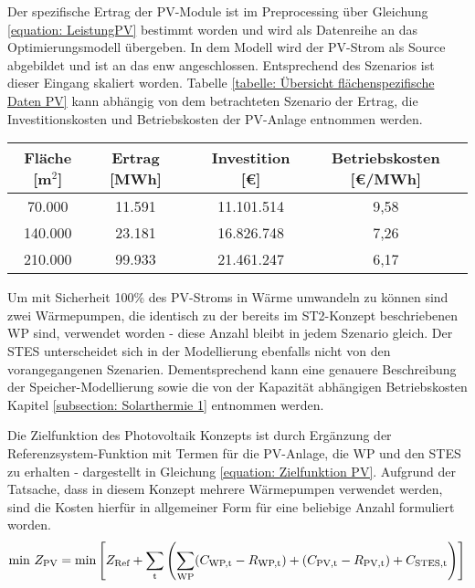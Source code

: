 Der spezifische Ertrag der \ac{PV}-Module ist im Preprocessing über Gleichung \ref{equation: LeistungPV} bestimmt worden und wird als Datenreihe an das Optimierungsmodell übergeben. In dem Modell wird der \ac{PV}-Strom als Source abgebildet und ist an das enw angeschlossen. Entsprechend des Szenarios ist dieser Eingang skaliert worden. Tabelle \ref{tabelle: Übersicht flächenspezifische Daten PV} kann abhängig von dem betrachteten Szenario der Ertrag, die Investitionskosten und Betriebskosten der \ac{PV}-Anlage entnommen werden. 
	\begin{center}
		\label{tabelle: Übersicht flächenspezifische Daten PV}
		\begin{tabular}{ccccc}
			\hline 
			Fläche [m$^2$] & Ertrag [MWh] & & Investition [\euro]  & Betriebskosten [\euro/MWh] \tabularnewline
			\hline 
			70.000 & 11.591 & & 11.101.514 & 9,58 \tabularnewline
			140.000 & 23.181 & & 16.826.748 & 7,26 \tabularnewline
			210.000 & 99.933 & & 21.461.247 & 6,17 \tabularnewline		
			\hline
		\end{tabular}
	\end{center} 

Um mit Sicherheit 100\% des \ac{PV}-Stroms in Wärme umwandeln zu können sind zwei Wärmepumpen, die identisch zu der bereits im ST2-Konzept beschriebenen \ac{WP} sind, verwendet worden - diese Anzahl bleibt in jedem Szenario gleich. 
Der \ac{STES} unterscheidet sich in der Modellierung ebenfalls nicht von den vorangegangenen Szenarien. Dementsprechend kann eine genauere Beschreibung der Speicher-Modellierung sowie die von der Kapazität abhängigen Betriebskosten Kapitel \ref{subsection: Solarthermie 1} entnommen werden. 

Die Zielfunktion des Photovoltaik Konzepts ist durch Ergänzung der Referenzsystem-Funktion mit Termen für die \ac{PV}-Anlage, die \ac{WP} und den \ac{STES} zu erhalten - dargestellt in Gleichung \ref{equation: Zielfunktion PV}. Aufgrund der Tatsache, dass in diesem Konzept mehrere Wärmepumpen verwendet werden, sind die Kosten hierfür in allgemeiner Form für eine beliebige Anzahl formuliert worden.
	\begin{equation}
		\label{equation: Zielfunktion PV}
			\text{min } Z_\text{PV} = \text{min} \left[Z_\text{Ref} + \sum_{\text{t}}^{} \left( \sum_\text{\text{WP}}^{} (C_\text{WP,t} - R_\text{WP,t}) + (C_\text{PV,t} - R_\text{PV,t}) + C_\text{STES,t}  \right)     \right]
	\end{equation}


